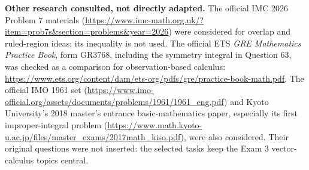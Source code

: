 \documentclass[11pt,letterpaper]{article}
\begin{document}
\textbf{Other research consulted, not directly adapted.}
The official IMC 2026 Problem 7 materials
(\url{https://www.imc-math.org.uk/?item=prob7s&section=problems&year=2026})
were considered for overlap and ruled-region ideas; its inequality is not
used. The official ETS \emph{GRE Mathematics Practice Book}, form GR3768,
including the symmetry integral in Question 63, was checked as a comparison
for observation-based calculus:
\url{https://www.ets.org/content/dam/ets-org/pdfs/gre/practice-book-math.pdf}.
The official IMO 1961 set
(\url{https://www.imo-official.org/assets/documents/problems/1961/1961_eng.pdf})
and Kyoto University's 2018 master's entrance basic-mathematics paper,
especially its first improper-integral problem
(\url{https://www.math.kyoto-u.ac.jp/files/master_exams/2017math_kiso.pdf}),
were also considered. Their original questions were not inserted: the
selected tasks keep the Exam 3 vector-calculus topics central.
\end{document}
